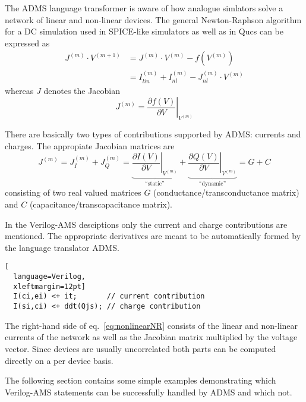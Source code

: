 The ADMS language transformer is aware of how analogue simlators solve
a network of linear and non-linear devices.  The general
Newton-Raphson algorithm for a DC simulation used in SPICE-like
simulators as well as in Qucs can be expressed as
\begin{equation}
\begin{split}
\label{eq:nonlinearNR}
J^{(m)}\cdot V^{(m+1)} &= J^{(m)}\cdot V^{(m)} - f\left(V^{(m)}\right)\\
&= I_{lin}^{(m)} + I_{nl}^{(m)} - J_{nl}^{(m)}\cdot V^{(m)}
\end{split}
\end{equation}
whereas $J$ denotes the Jacobian
\begin{equation}
J^{(m)} = \left.\dfrac{\partial f\left(V\right)}{\partial V}\right|_{V^{(m)}}
\end{equation}

There are basically two types of contributions supported by ADMS:
currents and charges.  The appropiate Jacobian matrices are
\begin{equation}
J^{(m)}
= J_I^{(m)} + J_Q^{(m)}
= \underbrace{\left.\dfrac{\partial I\left(V\right)}{\partial V}\right|_{V^{(m)}}}_{\textrm{``static''}} + \underbrace{\left.\dfrac{\partial Q\left(V\right)}{\partial V}\right|_{V^{(m)}}}_{\textrm{``dynamic''}}
= G + C
\end{equation}
consisting of two real valued matrices $G$
(conductance/transconductance matrix) and $C$
(capacitance/transcapacitance matrix).

\addvspace{12pt}

In the Verilog-AMS desciptions only the current and charge
contributions are mentioned.  The appropriate derivatives are meant to
be automatically formed by the language translator ADMS.
\begin{lstlisting}[
  language=Verilog,
  xleftmargin=12pt]
  I(ci,ei) <+ it;       // current contribution
  I(si,ci) <+ ddt(Qjs); // charge contribution
\end{lstlisting}

The right-hand side of eq.~\eqref{eq:nonlinearNR} consists of the
linear and non-linear currents of the network as well as the Jacobian
matrix multiplied by the voltage vector.  Since devices are usually
uncorrelated both parts can be computed directly on a per device
basis.


The following section contains some simple examples demonstrating
which Verilog-AMS statements can be successfully handled by ADMS and
which not.

